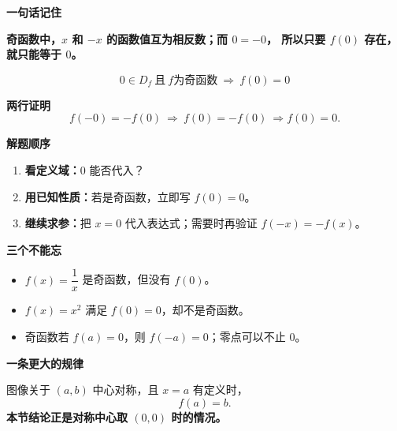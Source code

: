 \clearpage
\begin{summarybox}
  \textbf{\textcolor{CSummary}{一句话记住}}

  \textbf{奇函数中，$x$ 和 $-x$ 的函数值互为相反数；而 $0=-0$，
  所以只要 $f(0)$ 存在，就只能等于 $0$。}

  \[
    \boxed{0\in D_f\ \text{且}\ f\text{为奇函数}\ \Longrightarrow\ f(0)=0}
  \]

  \medskip
  \textbf{\textcolor{CSummary}{两行证明}}
  \[
    f(-0)=-f(0)
    \ \Longrightarrow\ f(0)=-f(0)
    \ \Longrightarrow\boxed{f(0)=0}.
  \]

  \medskip
  \textbf{\textcolor{CSummary}{解题顺序}}
  \begin{enumerate}[leftmargin=*, itemsep=0.35em, topsep=0.3em]
    \item \textbf{看定义域：}$0$ 能否代入？
    \item \textbf{用已知性质：}若是奇函数，立即写 $f(0)=0$。
    \item \textbf{继续求参：}把 $x=0$ 代入表达式；需要时再验证 $f(-x)=-f(x)$。
  \end{enumerate}

  \medskip
  \textbf{\textcolor{CSummary}{三个不能忘}}
  \begin{itemize}[leftmargin=*, itemsep=0.4em, topsep=0.3em]
    \item $f(x)=\dfrac1x$ 是奇函数，但没有 $f(0)$。
    \item $f(x)=x^2$ 满足 $f(0)=0$，却不是奇函数。
    \item 奇函数若 $f(a)=0$，则 $f(-a)=0$；零点可以不止 $0$。
  \end{itemize}

  \medskip
  \textbf{\textcolor{CSummary}{一条更大的规律}}

  图像关于 $(a,b)$ 中心对称，且 $x=a$ 有定义时，
  \[
    \boxed{f(a)=b.}
  \]
  \textbf{本节结论正是对称中心取 $(0,0)$ 时的情况。}
\end{summarybox}
